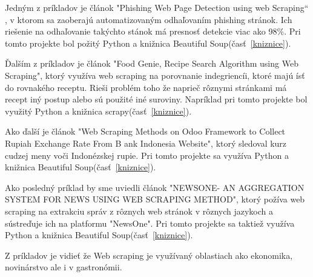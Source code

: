 \documentclass[10pt,twoside,slovak,a4paper]{article}
\begin{document}
Jedným z príkladov je článok "Phishing Web Page Detection using web Scraping“ \cite{10115148}, v ktorom sa zaoberajú automatizovaným odhaľovaním phishing stránok. Ich riešenie na odhaľovanie takýchto stánok má presnosť detekcie viac ako 98\%. Pri tomto projekte bol požitý Python a knižnica Beautiful Soup(časť~\ref{kniznice}).

Ďalším z príkladov je článok "Food Genie, Recipe Search Algorithm using Web Scraping"\cite{10270597}, ktorý využíva web scraping na porovnanie indegriencíi, ktoré majú ísť do rovnakého receptu. Rieši problém toho že naprieč rôznymi stránkami má recept iný postup alebo sú použité iné suroviny. Napríklad pri tomto projekte bol využitý Python a knižnica scrapy(časť~\ref{kniznice}).

Ako ďalší je článok "Web Scraping Methods on Odoo Framework to Collect Rupiah Exchange Rate From B ank Indonesia Website"\cite{9790917}, ktorý sledoval kurz cudzej meny voči Indonézskej rupie. Pri tomto projekte sa využíva Python a knižnica Beautiful Soup(časť~\ref{kniznice}).

Ako posledný príklad by sme uviedli článok "NEWSONE- AN AGGREGATION SYSTEM FOR NEWS USING WEB SCRAPING METHOD"\cite{8067594}, ktorý požíva web scraping na extrakciu správ z rôznych web stránok v rôznych jazykoch a sústreďuje ich na platformu "NewsOne". Pri tomto projekte sa taktiež využíva Python a knižnica Beautiful Soup(časť~\ref{kniznice}).

Z príkladov je vidieť že Web scraping je využívaný oblastiach ako ekonomika, novinárstvo ale i v gastronómii.
\end{document}
